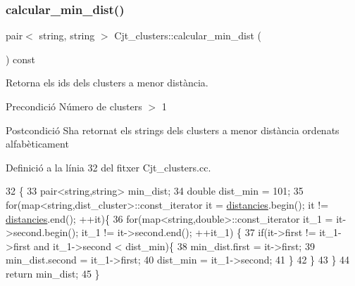 \subsubsection{\texorpdfstring{calcular\+\_\+min\+\_\+dist()}{calcular\_min\_dist()}}
{\footnotesize\ttfamily pair$<$ string, string $>$ Cjt\+\_\+clusters\+::calcular\+\_\+min\+\_\+dist (\begin{DoxyParamCaption}{ }\end{DoxyParamCaption}) const\hspace{0.3cm}{\ttfamily [private]}}



Retorna els ids dels clusters a menor distància. 

\begin{DoxyPrecond}{Precondició}
Número de clusters $>$ 1 
\end{DoxyPrecond}
\begin{DoxyPostcond}{Postcondició}
S\textquotesingle{}ha retornat els strings dels clusters a menor distància ordenats alfabèticament 
\end{DoxyPostcond}


Definició a la línia 32 del fitxer Cjt\+\_\+clusters.\+cc.


\begin{DoxyCode}
32                                                          \{
33     pair<string,string> min\_dist;
34     \textcolor{keywordtype}{double} dist\_min = 101;
35     \textcolor{keywordflow}{for}(map<string,dist\_cluster>::const\_iterator it = \hyperlink{class_cjt__clusters_a8e94e53830e3224d791dcf7dbd0a6082}{distancies}.begin(); it != 
      \hyperlink{class_cjt__clusters_a8e94e53830e3224d791dcf7dbd0a6082}{distancies}.end(); ++it)\{
36         \textcolor{keywordflow}{for}(map<string,double>::const\_iterator it\_1 = it->second.begin(); it\_1 != it->second.end(); ++it\_1)
      \{
37             \textcolor{keywordflow}{if}(it->first != it\_1->first and it\_1->second < dist\_min)\{
38                 min\_dist.first = it->first;
39                 min\_dist.second = it\_1->first;
40                 dist\_min = it\_1->second;
41             \}
42         \}
43     \}
44     \textcolor{keywordflow}{return} min\_dist;
45 \}
\end{DoxyCode}
\mbox{\label{class_cjt__clusters_a208f3642fdfe3c3ba9eacc659918f6fa}} 
